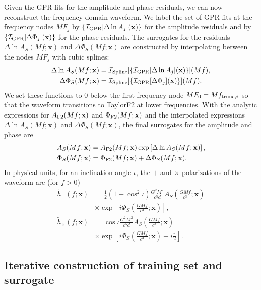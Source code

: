 \documentclass[prd,aps,letter,twocolumn,floatfix,notitlepage,nofootinbib]{revtex4-1}
\def\bx{\mathbf{x}}
\begin{document}
Given the GPR fits for the amplitude and phase residuals, we can now reconstruct the frequency-domain waveform. We label the set of GPR fits at the frequency nodes $MF_j$ by $\{\mathcal{I}_{\rm GPR}[\Delta\ln A_j](\bx)\}$ for the amplitude residuals and by $\{\mathcal{I}_{\rm GPR}[\Delta\Phi_j](\bx)\}$ for the phase residuals. The surrogates for the residuals $\Delta\ln A_S(Mf;\bx)$ and $\Delta\Phi_S(Mf;\bx)$ are constructed by interpolating between the nodes $MF_j$ with cubic splines:
\begin{align}
\Delta\ln A_S(Mf;\bx) &= \mathcal{I}_{\rm Spline}[\{\mathcal{I}_{\rm GPR}[\Delta\ln A_j](\bx)\}](Mf),\\
\Delta\Phi_S(Mf;\bx) &= \mathcal{I}_{\rm Spline}[\{\mathcal{I}_{\rm GPR}[\Delta\Phi_j](\bx)\}](Mf).
\end{align}
We set these functions to 0 below the first frequency node $MF_0 =  Mf_{{\rm trunc},i}$ so that the waveform transitions to TaylorF2 at lower frequencies. With the analytic expressions for $A_{\rm F2}(Mf;\bx)$ and $\Phi_{\rm F2}(Mf;\bx)$ and the interpolated expressions $\Delta\ln A_S(Mf;\bx)$ and $\Delta\Phi_S(Mf;\bx)$, the final surrogates for the amplitude and phase are
\begin{align}
\label{eq:amp_sur}
A_S(Mf;\bx) &= A_{\rm F2}(Mf;\bx) \exp\left[ \Delta\ln A_S(Mf;\bx) \right], \\
\label{eq:phase_sur}
\Phi_S(Mf;\bx) &= \Phi_{\rm F2}(Mf;\bx) + \Delta\Phi_S(Mf;\bx).
\end{align}
In physical units, for an inclination angle $\iota$, the $+$ and $\times$ polarizations of the waveform are (for $f>0$)
\begin{align}
\label{eq:hplus_sur}
\tilde h_+(f; \bx) &= \frac{1}{2}(1+\cos^2\iota) \frac{G^2 M^2}{c^5 d} A_S\left(\frac{GMf}{c^3}; \bx\right) \nonumber \\
& \times \exp\left[i \Phi_S\left(\frac{GMf}{c^3}; \bx\right)\right], \\
\label{eq:hcross_sur}
\tilde h_\times(f; \bx) &= \cos\iota \frac{G^2 M^2}{c^5 d} A_S\left(\frac{GMf}{c^3}; \bx\right) \nonumber \\
& \times \exp\left[i \Phi_S\left(\frac{GMf}{c^3}; \bx\right) + i \frac{\pi}{2}\right].
\end{align}


\subsection{Iterative construction of training set and surrogate}
\label{sec:design}
\end{document}
